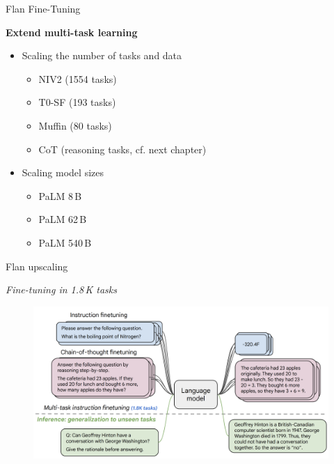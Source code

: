 \begin{vbframe}{Flan Fine-Tuning}

\vfill

\textbf{Extend multi-task learning} \vskip3mm

\begin{itemize}
\item Scaling the number of tasks and data
    \begin{itemize}
    \item NIV2 (1554 tasks)
    \item T0-SF (193 tasks)
    \item Muffin (80 tasks)
    \item CoT (reasoning tasks, cf. next chapter)
    \end{itemize}
\item Scaling model sizes
    \begin{itemize}
    \item PaLM 8\,B
    \item PaLM 62\,B
    \item PaLM 540\,B
    \end{itemize}
\end{itemize}

\vfill

\end{vbframe}


\begin{vbframe}{Flan upscaling}

\vfill

\textit{Fine-tuning in 1.8\,K tasks}
    
\begin{figure}
    \centering
    \includegraphics{figure/scaling_up_paradigms.png}\\
\end{figure}

\vfill

\end{vbframe}

